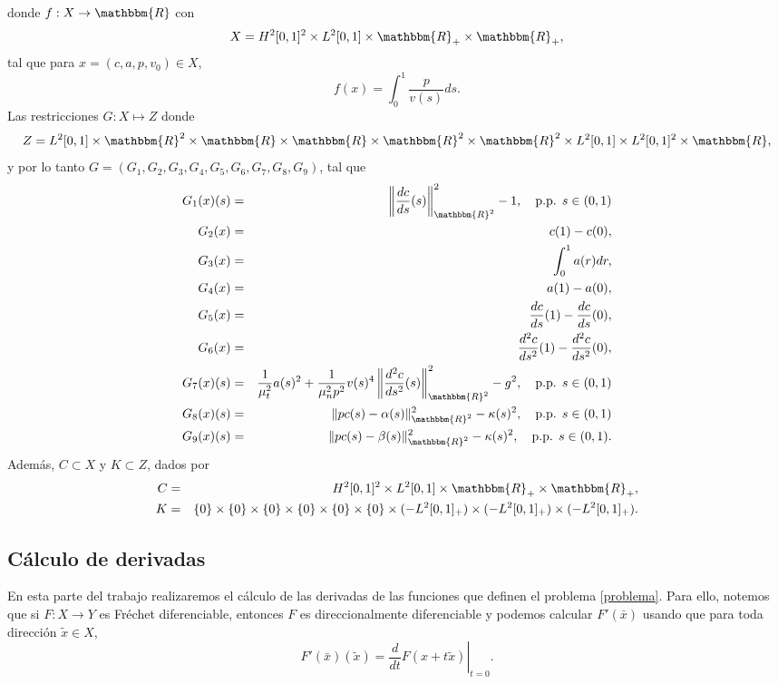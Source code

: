 \documentclass[a4paper,10pt]{book}
\newcommand{\R}{\mathbbm{R}}
\newcommand{\arr}{\rightarrow}
\newcommand{\bx}{\bar{x}}
\begin{document}
donde $f:X\arr \R$ con 
\[
 X=H^2[0,1]^2\times L^2[0,1]\times \R_+ \times \R_+,
\]
tal que para $x=(c,a,p,v_0)\in X$,
$$
 f(x)=\int_{0}^{1} \frac{p}{v(s)}ds.
$$
Las restricciones $G:X\mapsto Z$ donde
\[
Z=L^2[0,1]\times \R^2\times \R\times \R\times \R^2\times \R^2\times L^2[0,1] \times L^2[0,1]^2 \times \R,
\]
y por lo tanto $G=(G_1,G_2,G_3,G_4,G_5,G_6,G_7,G_8,G_9)$, tal que
\begin{eqnarray*}
 G_1(x)(s)&=&\left\|\frac{dc}{ds}(s)\right\|_{\R^2}^2-1,\quad \mbox{p.p. }s\in(0,1)\\
 G_2(x)&=&c(1)-c(0),\\
 G_3(x)&=&\int_{0}^{1} a(r)dr,\\
 G_4(x)&=&a(1)-a(0),\\
 G_5(x)&=&\frac{dc}{ds}(1)-\frac{dc}{ds}(0),\\
 G_6(x)&=&\frac{d^2c}{ds^2}(1)-\frac{d^2c}{ds^2}(0),\\
 G_7(x)(s)&=&\frac{1}{\mu_t^2} a(s)^2 + \frac{1}{\mu_n^2 p^2}v(s)^4\left\| \frac{d^2 c}{ds^2}(s) \right\|_{\R^2}^2-g^2,\quad \mbox{p.p. }s\in(0,1)\\
 G_8(x)(s)&=&\|pc(s)-\alpha(s)\|_{\R^2}^2-\kappa(s)^2, \quad \mbox{p.p. }s\in(0,1)\\
 G_9(x)(s)&=&\|pc(s)-\beta(s)\|_{\R^2}^2-\kappa(s)^2, \quad \mbox{p.p. }s\in(0,1).\\
\end{eqnarray*}
Adem\'as, $C\subset X$ y $K\subset Z$, dados por
\begin{eqnarray*}
C&=&H^2[0,1]^2\times L^2[0,1]\times \R_+ \times \R_+,\\
K&=&\{0\}\times \{0\}\times \{0\}\times \{0\}\times \{0\}\times \{0\}\times (-L^2[0,1]_+) \times (-L^2[0,1]_+) \times (-L^2[0,1]_+).
\end{eqnarray*}


\subsection{Cálculo de derivadas}
En esta parte del trabajo realizaremos el cálculo de las derivadas de las funciones que definen el problema \eqref{problema}. Para ello, notemos que si $F:X\arr Y$ es Fréchet diferenciable, entonces $F$ es direccionalmente diferenciable y podemos calcular $F'(\bx)$ usando que para toda dirección $\tilde x\in X$,
$$F'(\bx)(\tilde x)=\left.\frac{d}{dt}F(x+t\tilde{x})\right|_{t=0}.$$
\end{document}
